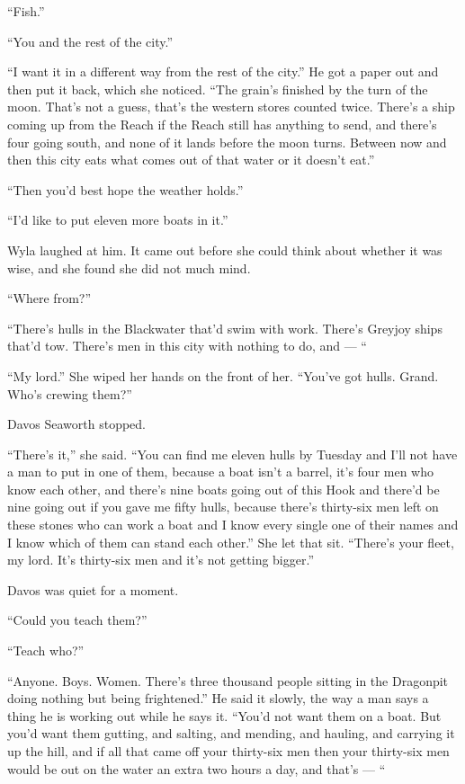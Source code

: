 “Fish.”

“You and the rest of the city.”

“I want it in a different way from the rest of the city.” He got a paper out and then put it back, which she noticed. “The grain’s finished by the turn of the moon. That’s not a guess, that’s the western stores counted twice. There’s a ship coming up from the Reach if the Reach still has anything to send, and there’s four going south, and none of it lands before the moon turns. Between now and then this city eats what comes out of that water or it doesn’t eat.”

“Then you’d best hope the weather holds.”

“I’d like to put eleven more boats in it.”

Wyla laughed at him. It came out before she could think about whether it was wise, and she found she did not much mind.

“Where from?”

“There’s hulls in the Blackwater that’d swim with work. There’s Greyjoy ships that’d tow. There’s men in this city with nothing to do, and — “

“My lord.” She wiped her hands on the front of her. “You’ve got hulls. Grand. Who’s crewing them?”

Davos Seaworth stopped.

“There’s it,” she said. “You can find me eleven hulls by Tuesday and I’ll not have a man to put in one of them, because a boat isn’t a barrel, it’s four men who know each other, and there’s nine boats going out of this Hook and there’d be nine going out if you gave me fifty hulls, because there’s thirty-six men left on these stones who can work a boat and I know every single one of their names and I know which of them can stand each other.” She let that sit. “There’s your fleet, my lord. It’s thirty-six men and it’s not getting bigger.”

Davos was quiet for a moment.

“Could you teach them?”

“Teach who?”

“Anyone. Boys. Women. There’s three thousand people sitting in the Dragonpit doing nothing but being frightened.” He said it slowly, the way a man says a thing he is working out while he says it. “You’d not want them on a boat. But you’d want them gutting, and salting, and mending, and hauling, and carrying it up the hill, and if all that came off your thirty-six men then your thirty-six men would be out on the water an extra two hours a day, and that’s — “

